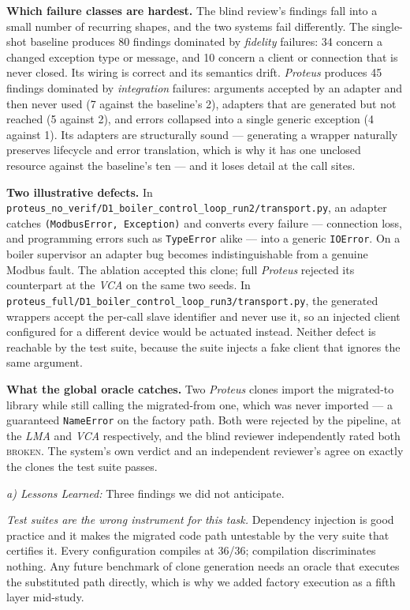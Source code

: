 \textbf{Which failure classes are hardest.} The blind review's findings fall
into a small number of recurring shapes, and the two systems fail differently.
The single-shot baseline produces 80 findings dominated by \emph{fidelity}
failures: 34 concern a changed exception type or message, and 10 concern a
client or connection that is never closed. Its wiring is correct and its
semantics drift. \emph{Proteus} produces 45 findings dominated by
\emph{integration} failures: arguments accepted by an adapter and then never
used (7 against the baseline's 2), adapters that are generated but not reached
(5 against 2), and errors collapsed into a single generic exception (4 against
1). Its adapters are structurally sound --- generating a wrapper naturally
preserves lifecycle and error translation, which is why it has one unclosed
resource against the baseline's ten --- and it loses detail at the call sites.

\textbf{Two illustrative defects.} In
\texttt{proteus\_no\_verif/D1\_boiler\_control\_loop\_run2/transport.py}, an
adapter catches \texttt{(ModbusError, Exception)} and converts every failure
--- connection loss, and programming errors such as \texttt{TypeError} alike
--- into a generic \texttt{IOError}. On a boiler supervisor an adapter bug
becomes indistinguishable from a genuine Modbus fault. The ablation accepted
this clone; full \emph{Proteus} rejected its counterpart at the \emph{VCA} on
the same two seeds. In
\texttt{proteus\_full/D1\_boiler\_control\_loop\_run3/transport.py}, the
generated wrappers accept the per-call slave identifier and never use it, so an
injected client configured for a different device would be actuated instead.
Neither defect is reachable by the test suite, because the suite injects a fake
client that ignores the same argument.

\textbf{What the global oracle catches.} Two \emph{Proteus} clones import the
migrated-to library while still calling the migrated-from one, which was never
imported --- a guaranteed \texttt{NameError} on the factory path. Both were
rejected by the pipeline, at the \emph{LMA} and \emph{VCA} respectively, and
the blind reviewer independently rated both \textsc{broken}. The system's own
verdict and an independent reviewer's agree on exactly the clones the test
suite passes.

\emph{a) Lessons Learned:} Three findings we did not anticipate.

\emph{Test suites are the wrong instrument for this task.} Dependency injection
is good practice and it makes the migrated code path untestable by the very
suite that certifies it. Every configuration compiles at 36/36; compilation
discriminates nothing. Any future benchmark of clone generation needs an
oracle that executes the substituted path directly, which is why we added
factory execution as a fifth layer mid-study.

